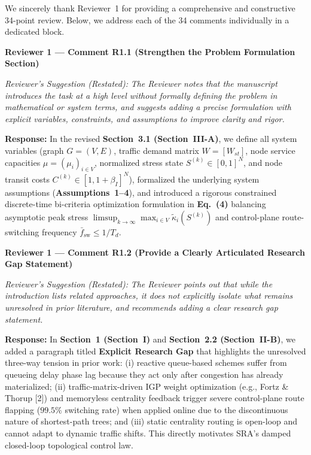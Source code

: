 \documentclass[11pt,a4paper]{article}
\newcommand{\cbox}[2]{%
  \vspace{0.6em}\noindent\textbf{#1}\par\smallskip
  \noindent\textit{Reviewer's Suggestion (Restated):} \textit{#2}\par\smallskip
}
\begin{document}
We sincerely thank Reviewer~1 for providing a comprehensive and constructive 34-point review. Below, we address each of the 34 comments individually in a dedicated block.

\cbox{Reviewer 1 --- Comment R1.1 (Strengthen the Problem Formulation Section)}{The Reviewer notes that the manuscript introduces the task at a high level without formally defining the problem in mathematical or system terms, and suggests adding a precise formulation with explicit variables, constraints, and assumptions to improve clarity and rigor.}

\noindent\textbf{Response:} In the revised \textbf{Section~3.1 (Section~III-A)}, we define all system variables (graph $G=(V,E)$, traffic demand matrix $W=[W_{st}]$, node service capacities $\mu=(\mu_i)_{i\in V}$, normalized stress state $S^{(k)}\in [0,1]^N$, and node transit costs $C^{(k)}\in [1, 1+\beta_I]^N$), formalized the underlying system assumptions (\textbf{Assumptions~1--4}), and introduced a rigorous constrained discrete-time bi-criteria optimization formulation in \textbf{Eq.~(4)} balancing asymptotic peak stress $\limsup_{k\to\infty}\max_{i\in V}\widetilde{\kappa}_i(S^{(k)})$ and control-plane route-switching frequency $\bar{f}_{\text{sw}} \le 1/T_d$.

\hrulefill

\cbox{Reviewer 1 --- Comment R1.2 (Provide a Clearly Articulated Research Gap Statement)}{The Reviewer points out that while the introduction lists related approaches, it does not explicitly isolate what remains unresolved in prior literature, and recommends adding a clear research gap statement.}

\noindent\textbf{Response:} In \textbf{Section~1 (Section~I)} and \textbf{Section~2.2 (Section~II-B)}, we added a paragraph titled \textbf{Explicit Research Gap} that highlights the unresolved three-way tension in prior work: (i) reactive queue-based schemes suffer from queueing delay phase lag because they act only after congestion has already materialized; (ii) traffic-matrix-driven IGP weight optimization (e.g., Fortz \& Thorup [2]) and memoryless centrality feedback trigger severe control-plane route flapping ($99.5\%$ switching rate) when applied online due to the discontinuous nature of shortest-path trees; and (iii) static centrality routing is open-loop and cannot adapt to dynamic traffic shifts. This directly motivates SRA's damped closed-loop topological control law.

\hrulefill
\end{document}

